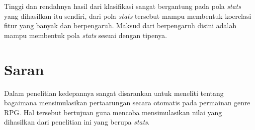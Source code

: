 Tinggi dan rendahnya hasil dari klasifikasi sangat bergantung pada pola \textit{stats} yang dihasilkan itu sendiri, dari pola \textit{stats} tersebut mampu membentuk koerelasi fitur yang banyak dan berpengaruh. Maksud dari berpengaruh disini adalah mampu membentuk pola \textit{stats} sesuai dengan tipenya.   

\section{Saran}
\label{sec:sec4_saran}
\vspace{1ex}

Dalam penelitian kedepannya sangat disarankan untuk meneliti tentang bagaimana mensimulasikan pertaarungan secara otomatis pada permainan genre RPG. Hal tersebut bertujuan guna mencoba mensimulasikan nilai yang dihasilkan dari penelitian ini yang berupa \textit{stats}.